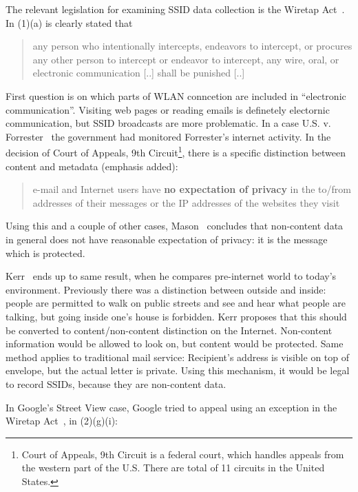 \documentclass[12pt,a4paper,oneside,pdftex]{report}
\begin{document}
The relevant legislation for examining SSID data collection is the Wiretap Act~\cite{wiretap_act}. In (1)(a) is clearly stated that

\begin{quote}
    any person who intentionally intercepts, endeavors to intercept, or procures any other person to intercept or endeavor to intercept, any wire, oral, or electronic communication [..] shall be punished [..]
\end{quote}

First question is on which parts of WLAN conncetion are included in ``electronic communication''. Visiting web pages or reading emails is definetely electornic communication, but SSID broadcasts are more problematic. In a case U.S. v. Forrester~\cite{us_forrester} the government had monitored Forrester's internet activity. In the decision of Court of Appeals, 9th Circuit\footnote{Court of Appeals, 9th Circuit is a federal court, which handles appeals from the western part of the U.S. There are total of 11 circuits in the United States.}, there is a specific distinction between content and metadata (emphasis added):

\begin{quote}
    e-mail and Internet users have \textbf{no expectation of privacy} in the to/from addresses of their messages or the IP addresses of the websites they visit
\end{quote}

Using this and a couple of other cases, Mason~\cite{mason2014aligning} concludes that non-content data in general does not have reasonable expectation of privacy: it is the message which is protected. 

Kerr~\cite{kerr2009applying} ends up to same result, when he compares pre-internet world to today's environment. Previously there was a distinction between outside and inside: people are permitted to walk on public streets and see and hear what people are talking, but going inside one's house is forbidden. Kerr proposes that this should be converted to content/non-content distinction on the Internet. Non-content information would be allowed to look on, but content would be protected. Same method applies to traditional mail service: Recipient's address is visible on top of envelope, but the actual letter is private. Using this mechanism, it would be legal to record SSIDs, because they are non-content data.

In Google's Street View case, Google tried to appeal using an exception in the Wiretap Act~\cite{google_joffe}, in (2)(g)(i):
\end{document}
